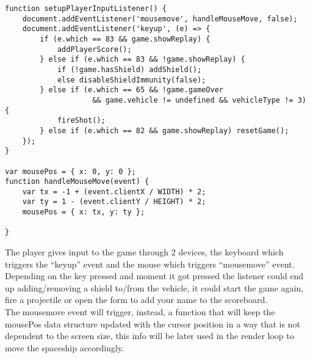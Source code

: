 \documentclass[a4paper,11pt]{article}
\begin{document}
\begin{verbatim}
function setupPlayerInputListener() {
    document.addEventListener('mousemove', handleMouseMove, false);
    document.addEventListener('keyup', (e) => {
        if (e.which == 83 && game.showReplay) {
            addPlayerScore();
        } else if (e.which == 83 && !game.showReplay) {
            if (!game.hasShield) addShield();
            else disableShieldImmunity(false);
        } else if (e.which == 65 && !game.gameOver 
                    && game.vehicle != undefined && vehicleType != 3) {
            fireShot();
        } else if (e.which == 82 && game.showReplay) resetGame();
    });
}

var mousePos = { x: 0, y: 0 };
function handleMouseMove(event) {
    var tx = -1 + (event.clientX / WIDTH) * 2;
    var ty = 1 - (event.clientY / HEIGHT) * 2;
    mousePos = { x: tx, y: ty };

}

\end{verbatim}
The player gives input to the game through 2 devices, the keyboard which triggers the ``keyup'' event and the mouse which triggers ``mousemove'' event.\\
Depending on the key pressed and moment it got pressed the listener could end up adding/removing a shield to/from the vehicle, it could start the game again, fire a projectile or open the form to add your name to the scoreboard.\\
The mousemove event will trigger, instead, a function that will keep the mousePos data structure updated with the cursor position in a way that is not dependent to the screen size, this info will be later used in the render loop to move the spaceship accordingly.
\end{document}
